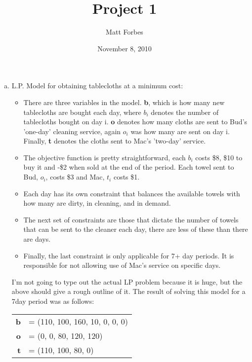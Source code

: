 \documentclass[a4paper,12pt]{article}
\begin{document}
\title{Project 1}
\author{Matt Forbes}
\date{November 8, 2010}
\maketitle

\begin{enumerate}[a)]
    \item L.P. Model for obtaining tablecloths at a minimum cost:

      \begin{itemize}
        \item
          There are three variables in the model. {\bf b}, which is how many
          new tablecloths are bought each day, where \(b_i\) denotes the number of tablecloths
          bought on day i. {\bf o} denotes how many cloths are sent to Bud's 'one-day'
          cleaning service, again \(o_i\) was how many are sent on day i. Finally,
          {\bf t} denotes the cloths sent to Mac's 'two-day' service.

        \item
          The objective function is pretty straightforward, each \(b_i\) costs \$8, \$10 to
          buy it and -\$2 when sold at the end of the period. Each towel sent to Bud, \(o_i\), costs \$3 and
          Mac, \(t_i\) costs \$1. 

        \item
          Each day has its own constraint that balances the available towels with how many are dirty, in
          cleaning, and in demand. 

        \item
          The next set of constraints are those that dictate the number of towels that can be sent to
          the cleaner each day, there are less of these than there are days.

        \item
          Finally, the last constraint is only applicable for 7+ day periods. It is responsible for not
          allowing use of Mac's service on specific days.

      \end{itemize}

      I'm not going to type out the actual LP problem because it is huge, but the above should give a rough
      outline of it. The result of solving this model for a 7day period was as follows:

      \begin{tabular}{r l}
        {\bf b}& = (110, 100, 160, 10, 0, 0, 0)\\
        {\bf o}& = (0, 0, 80, 120, 120)\\
        {\bf t}& = (110, 100, 80, 0)
      \end{tabular}


\end{enumerate}
\end{document}
